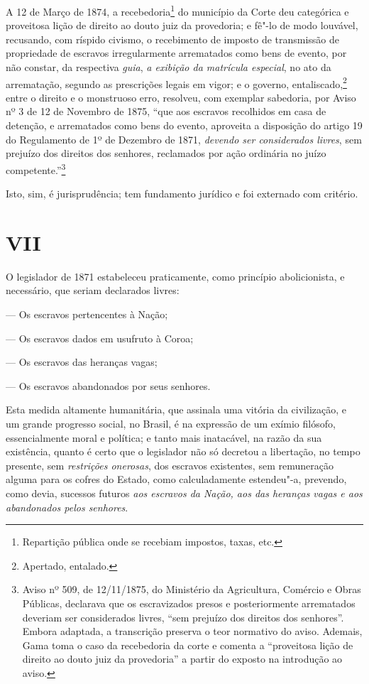 A 12 de Março de 1874, a recebedoria\footnote{Repartição pública onde
  se recebiam impostos, taxas, etc.} do município da Corte deu
categórica e proveitosa lição de direito ao douto juiz da provedoria; e
fê"-lo de modo louvável, recusando, com ríspido civismo, o recebimento de
imposto de transmissão de propriedade de escravos irregularmente
arrematados como bens de evento, por não constar, da respectiva
\emph{guia}, \emph{a exibição da matrícula especial}, no ato da
arrematação, segundo as prescrições legais em vigor; e o governo,
entaliscado,\footnote{Apertado, entalado.} entre o direito e o
monstruoso erro, resolveu, com exemplar sabedoria, por Aviso nº 3 de 12
de Novembro de 1875, ``que aos escravos recolhidos em casa de detenção, e
arrematados como bens do evento, aproveita a disposição do artigo 19 do
Regulamento de 1º de Dezembro de 1871, \emph{devendo ser considerados
livres}, sem prejuízo dos direitos dos senhores, reclamados por ação
ordinária no juízo competente.''\footnote{Aviso nº 509, de 12/11/1875,
  do Ministério da Agricultura, Comércio e Obras Públicas, declarava que
  os escravizados presos e posteriormente arrematados deveriam ser
  considerados livres, ``sem prejuízo dos direitos dos senhores''. Embora
  adaptada, a transcrição preserva o teor normativo do aviso. Ademais,
  Gama toma o caso da recebedoria da corte e comenta a ``proveitosa lição
  de direito ao douto juiz da provedoria'' a partir do exposto na
  introdução ao aviso.}

Isto, sim, é jurisprudência; tem fundamento jurídico e foi externado com
critério.

\section*{VII}

O legislador de 1871 estabeleceu praticamente, como princípio
abolicionista, e necessário, que seriam declarados livres:

--- Os escravos pertencentes à Nação;

--- Os escravos dados em usufruto à Coroa;

--- Os escravos das heranças vagas;

--- Os escravos abandonados por seus senhores.

Esta medida altamente humanitária, que assinala uma vitória da
civilização, e um grande progresso social, no Brasil, é na expressão de
um exímio filósofo, essencialmente moral e política; e tanto mais
inatacável, na razão da sua existência, quanto é certo que o legislador
não só decretou a libertação, no tempo presente, sem \emph{restrições
onerosas}, dos escravos existentes, sem remuneração alguma para os
cofres do Estado, como calculadamente estendeu"-a, prevendo, como devia,
sucessos futuros \emph{aos escravos da Nação, aos das heranças vagas e
aos abandonados pelos senhores}.


